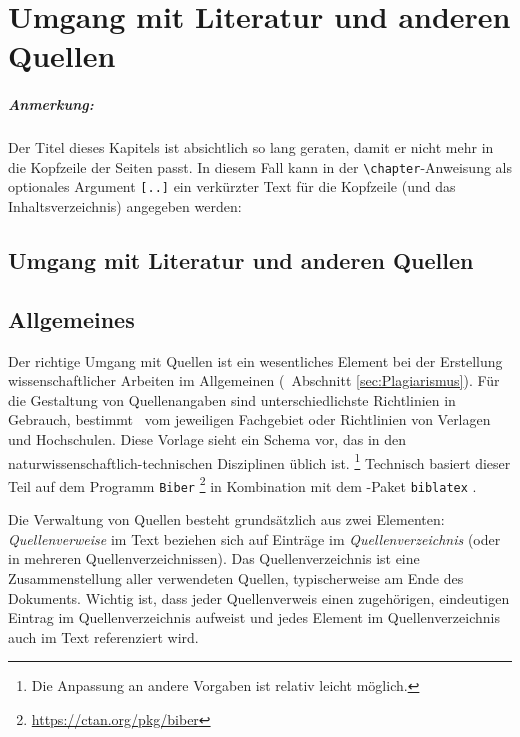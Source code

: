 \chapter[Umgang mit Literatur]{Umgang mit Literatur und anderen Quellen}
\label{cha:Literatur}

\paragraph{Anmerkung:} Der Titel dieses Kapitels ist absichtlich so lang
geraten, damit er nicht mehr in die Kopfzeile der Seiten passt. In diesem
Fall kann in der \verb!\chapter!-Anweisung als optionales Argument
\verb![..]! ein verkürzter Text für die Kopfzeile (und das
Inhaltsverzeichnis) angegeben werden:
%
\begin{LaTeXCode}[numbers=none]
\chapter[Umgang mit Literatur]{Umgang mit Literatur und anderen Quellen}
\end{LaTeXCode}


\section{Allgemeines}

Der richtige Umgang mit Quellen ist ein wesentliches Element bei der
Erstellung wissenschaftlicher Arbeiten im Allgemeinen (\sa\ Abschnitt
\ref{sec:Plagiarismus}). Für die Gestaltung von Quellenangaben sind
unterschiedlichste Richtlinien in Gebrauch, bestimmt \ua\ vom jeweiligen
Fachgebiet oder Richtlinien von Verlagen und Hochschulen. Diese Vorlage sieht
ein Schema vor, das in den natur\-wissen\-schaftlich-technischen Disziplinen
üblich ist.%
\footnote{Die Anpassung an andere Vorgaben ist relativ leicht möglich.}
Technisch basiert dieser Teil auf dem Programm \texttt{Biber}%
\footnote{\url{https://ctan.org/pkg/biber}}
in Kombination mit dem \latex-Paket \texttt{biblatex} \cite{Kime2026}.

Die Verwaltung von Quellen besteht grundsätzlich aus zwei Elementen:
\emph{Quellenverweise} im Text beziehen sich auf Einträge im
\emph{Quellenverzeichnis} (oder in mehreren Quellenverzeichnissen). Das
Quellenverzeichnis ist eine Zusammenstellung aller verwendeten Quellen,
typischerweise am Ende des Dokuments. Wichtig ist, dass jeder Quellenverweis
einen zugehörigen, eindeutigen Eintrag im Quellenverzeichnis aufweist und
jedes Element im Quellenverzeichnis auch im Text referenziert wird.



